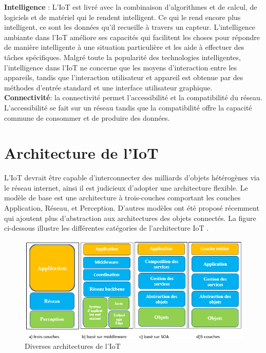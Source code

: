\textbf{Intelligence} : L'IoT est livré avec la combinaison d'algorithmes et de calcul, de logiciels et de matériel qui le rendent intelligent. Ce qui le rend encore plus intelligent, ce sont les données qu’il recueille à travers un capteur. L'intelligence ambiante dans l'IoT améliore ses capacités qui facilitent les choses pour répondre de manière intelligente à une situation particulière et les aide à ef{\kern0pt}fectuer des tâches spécif{\kern0pt}iques. Malgré toute la popularité des technologies intelligentes, l'intelligence dans l'IoT ne concerne que les moyens d'interaction entre les appareils, tandis que l'interaction utilisateur et appareil est obtenue par des méthodes d'entrée standard et une interface utilisateur graphique.\\

\textbf{Connectivité}: la connectivité permet l'accessibilité et la compatibilité du réseau. L'accessibilité se fait sur un réseau tandis que la compatibilité of{\kern0pt}fre la capacité commune de consommer et de produire des données.

\section{Architecture de l’IoT}	
L’IoT devrait être capable d’interconnecter des milliards d’objets hétérogènes via le réseau internet, ainsi il est judicieux d’adopter une architecture flexible. Le modèle de base est une architecture à trois-couches comportant les couches Application, Réseau, et Perception. D’autres modèles ont été proposé récemment qui ajoutent plus d’abstraction aux architectures des objets connectés. La f{\kern0pt}igure ci-dessous illustre les dif{\kern0pt}férentes catégories de l’architecture IoT \cite{al2015iot}.\\

\begin{figure}[H]
	\begin{center}
		\includegraphics[width=\textwidth]{IMAGES/ORIGINALS/diverses_architectures_de_l'IoT}
	\end{center}
	\caption{Diverses architectures de l'IoT}
\end{figure}


